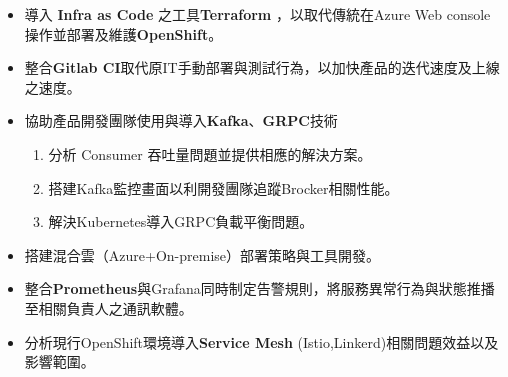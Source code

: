 \begin{experiences}
{\begin{itemize}
                        \begin{enumerate}
                        	\item 設計admission controller 驗證使用者操作行為。
                            \item 整合Custom Resources Definition用以操作企業內部有狀態服務管理的自定義資源。
                        \end{enumerate}
                        \item 導入 \textbf{Infra as Code} 之工具\textbf{Terraform} ，以取代傳統在Azure Web console 操作並部署及維護\textbf{OpenShift}。           
                        \item 整合\textbf{Gitlab CI}取代原IT手動部署與測試行為，以加快產品的迭代速度及上線之速度。                
                        \item 協助產品開發團隊使用與導入\textbf{Kafka}、\textbf{GRPC}技術
                        \begin{enumerate}
                        	\item 分析 Consumer 吞吐量問題並提供相應的解決方案。
                            \item 搭建Kafka監控畫面以利開發團隊追蹤Brocker相關性能。
                            \item 解決Kubernetes導入GRPC負載平衡問題。
                        \end{enumerate}
                        \item 搭建混合雲（Azure+On-premise）部署策略與工具開發。
                        \item 整合\textbf{Prometheus}與Grafana同時制定告警規則，將服務異常行為與狀態推播至相關負責人之通訊軟體。
                        \item 分析現行OpenShift環境導入\textbf{Service Mesh} (Istio,Linkerd)相關問題效益以及影響範圍。
                        

\end{itemize}}
\end{experiences}

